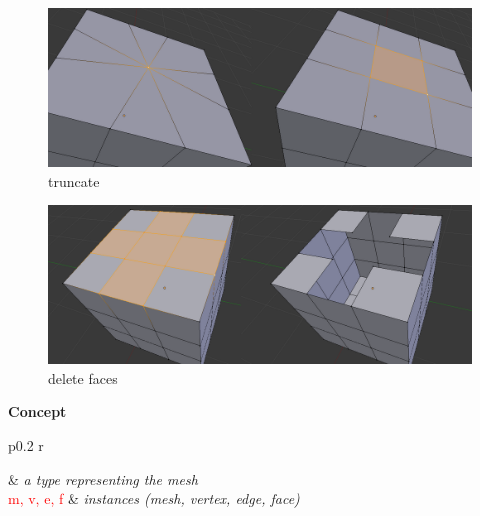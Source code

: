 \documentclass{article}
\begin{document}
\newpage

\begin{figure}[!h]
\includegraphics[scale=0.25]{truncate1.png}
\caption{truncate}
\end{figure}

\begin{figure}[!h]
\includegraphics[scale=0.25]{deleteF.png}
\caption{delete faces}
\end{figure}

\newpage

\textbf{Concept}
\\

\begin{tabular}{p{} r}

 & \emph{a type representing the mesh}\\
\textsf{\textcolor{red}{m, v, e, f}} & \emph{instances (mesh, vertex, edge, face)}
\end{tabular}
\end{document}
